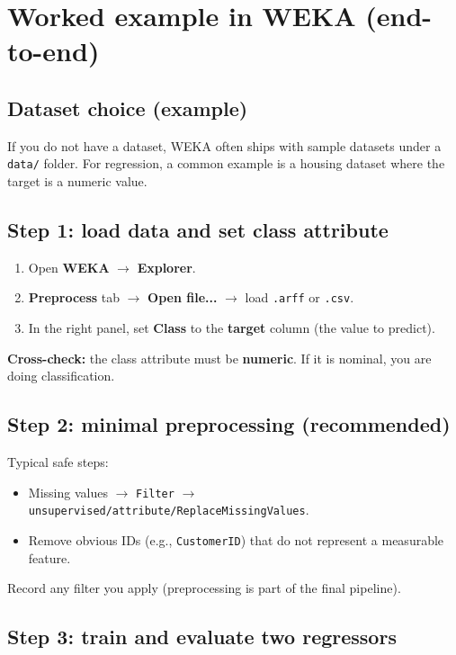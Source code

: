 \documentclass[11pt]{article}
\begin{document}
\section{Worked example in WEKA (end-to-end)}
\subsection{Dataset choice (example)}
If you do not have a dataset, WEKA often ships with sample datasets under a \texttt{data/} folder.
For regression, a common example is a housing dataset where the target is a numeric value.

\subsection{Step 1: load data and set class attribute}
\begin{enumerate}[leftmargin=*]
  \item Open \textbf{WEKA} $\rightarrow$ \textbf{Explorer}.
  \item \textbf{Preprocess} tab $\rightarrow$ \textbf{Open file...} $\rightarrow$ load \texttt{.arff} or \texttt{.csv}.
  \item In the right panel, set \textbf{Class} to the \textbf{target} column (the value to predict).
\end{enumerate}
\textbf{Cross-check:} the class attribute must be \textbf{numeric}. If it is nominal, you are doing classification.

\subsection{Step 2: minimal preprocessing (recommended)}
Typical safe steps:
\begin{itemize}[leftmargin=*]
  \item Missing values $\rightarrow$ \texttt{Filter} $\rightarrow$ \texttt{unsupervised/attribute/ReplaceMissingValues}.
  \item Remove obvious IDs (e.g., \texttt{CustomerID}) that do not represent a measurable feature.
\end{itemize}
Record any filter you apply (preprocessing is part of the final pipeline).

\subsection{Step 3: train and evaluate two regressors}
\end{document}
